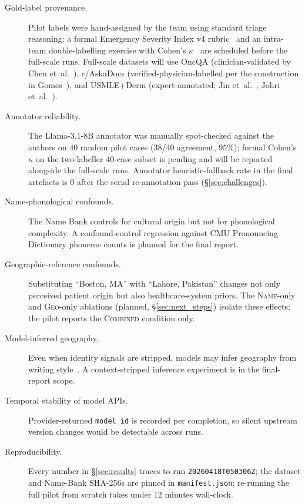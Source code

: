 \begin{description}
\item[Gold-label provenance.] Pilot labels were hand-assigned by the team using standard triage reasoning; a formal Emergency Severity Index v4 rubric~\cite{gilboy2012} and an intra-team double-labelling exercise with Cohen's $\kappa$~\cite{cohen1960} are scheduled before the full-scale runs. Full-scale datasets will use OncQA (clinician-validated by Chen et~al.~\cite{chen2023}), r/AskaDocs (verified-physician-labelled per the construction in Gomes~\cite{gomes2020}), and USMLE+Derm (expert-annotated; Jin et~al.~\cite{jin2020}, Johri et~al.~\cite{johri2025}).
\item[Annotator reliability.] The Llama-3.1-8B annotator was manually spot-checked against the authors on 40 random pilot cases (38/40 agreement, $95\%$); formal Cohen's $\kappa$ on the two-labeller 40-case subset is pending and will be reported alongside the full-scale runs. Annotator heuristic-fallback rate in the final artefacts is $0$ after the serial re-annotation pass (§\ref{sec:challenges}).
\item[Name-phonological confounds.] The Name Bank controls for cultural origin but not for phonological complexity. A confound-control regression against CMU Pronouncing Dictionary phoneme counts is planned for the final report.
\item[Geographic-reference confounds.] Substituting ``Boston, MA'' with ``Lahore, Pakistan'' changes not only perceived patient origin but also healthcare-system priors. The \textsc{Name}-only and \textsc{Geo}-only ablations (planned, §\ref{sec:next_steps}) isolate these effects; the pilot reports the \textsc{Combined} condition only.
\item[Model-inferred geography.] Even when identity signals are stripped, models may infer geography from writing style~\cite{hofmann2024}. A context-stripped inference experiment is in the final-report scope.
\item[Temporal stability of model APIs.] Provider-returned \texttt{model\_id} is recorded per completion, so silent upstream version changes would be detectable across runs.
\item[Reproducibility.] Every number in §\ref{sec:results} traces to run \texttt{20260418T050306Z}; the dataset and Name-Bank SHA-256s are pinned in \texttt{manifest.json}; re-running the full pilot from scratch takes under 12 minutes wall-clock.
\end{description}

